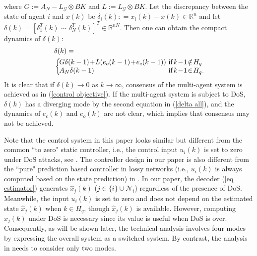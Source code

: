 \documentclass[letterpaper,journal,final,twocolumn]{IEEEtran}
\begin{document}
where $G:=A_N - L_\mathcal G \otimes BK$ and 
$
L := L_ \mathcal{G} \otimes BK.
$
Let the discrepancy between the state of agent $i$ and $\overline{x}(k)$ be $\delta_i(k) : = x_i(k) - \overline x(k) \in \mathbb{R} ^n$ and let $\delta(k) = [\delta_1 ^T  (k) \,\,\cdots \,\, \delta_N  ^T (k)]^T \in \mathbb{R}^{nN}$. Then one can obtain the compact dynamics of $\delta(k)$:
\begin{align}\label{delta all}
&\delta(k) = \nonumber\\
&\left\{\!\!\!\!
\begin{array}{ll}\setlength{\arraycolsep}{0.1pt} 
G \delta(k-1) \! + \! L(e_o(k-1) \!+\! e_c(k-1)) & \!\!\!\! \text{if}\, k\!-\!1 \!\notin\! H_q \\
A_N \delta(k-1) & \!\!\!\! \text{if}\, k\!-\!1 \!\in\! H_q. 
\end{array}
\right.\!\!\!\!
\end{align}
It is clear that if $\delta (k) \to 0$ as $k \to \infty$, consensus of the multi-agent system is achieved as in (\ref{control objective}).
If the multi-agent system is subject to DoS, $\delta(k)$ has a diverging mode by the second equation in (\ref{delta all}), and the dynamics of $e_c(k)$ and $e_o(k)$ are not clear, which implies that consensus may not be achieved.  


Note that the control system in this paper looks similar but different from the common ``to zero" static controller, i.e., the control input $u_i(k)$ is set to zero under DoS attacks, 
see \cite{senejohnny2017jamming}. The controller design in our paper is also different from the ``pure" prediction based controller in lossy networks (i.e., $u_i(k)$ is always computed based on the state prediction) in \cite{feng2020arxiv, feng2019secure}. In our paper, the decoder (\ref{eq estimator}) generates $\hat x_j(k)$ ($j \in \{i\}\cup\mathcal N_i  $) regardless of the presence of DoS. Meanwhile, the input $u_i(k)$ is set to zero and does not depend on the estimated state $\hat x_j(k)$ when $k \in H_q$, though $\hat x_j(k)$ is available. However, computing $\hat x_j(k)$ under DoS is necessary since its value is useful when DoS is over. Consequently, as will be shown later, the technical analysis involves four modes by expressing the overall system as a switched system. By contrast, the analysis in \cite{feng2020arxiv} needs to consider only two modes.  
\end{document}
